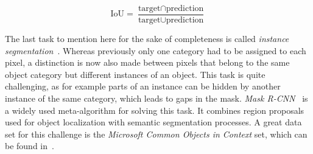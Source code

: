 \begin{equation}
    \label{eq:iou}
    \text{IoU} = \frac{\text{target} \cap \text{prediction}}{\text{target} \cup \text{prediction}}
\end{equation}

The last task to mention here for the sake of completeness is called \emph{instance segmentation}~\cite{mask-rcnn14}. Whereas previously only one category had to be assigned to each pixel, a distinction is now also made between pixels that belong to the same object category but different instances of an object. This task is quite challenging, as for example parts of an instance can be hidden by another instance of the same category, which leads to gaps in the mask. \emph{Mask R-CNN}~\cite{mask-rcnn14} is a widely used meta-algorithm for solving this task. It combines region proposals used for object localization with semantic segmentation processes. A great data set for this challenge is the \emph{Microsoft Common Objects in Context} set, which can be found in~\cite{coco15}.

